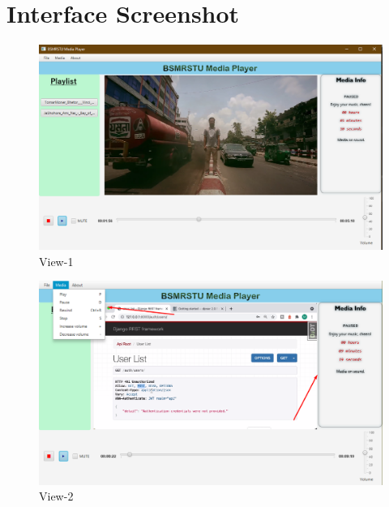 \documentclass{report}
\begin{document}
\pagebreak

\section{Interface Screenshot}
\begin{figure}[!h]
  \centering
  \caption[Interface Initial]{View-1}
  \vspace*{0.1cm}
  \includegraphics[scale=0.45]{img/view-1.png}
\end{figure}

\begin{figure}[!h]
  \centering
  \caption[Interface Menus]{View-2}
  \vspace*{0.1cm}
  \includegraphics[scale=0.45]{img/view-2.png}
\end{figure}
\end{document}
